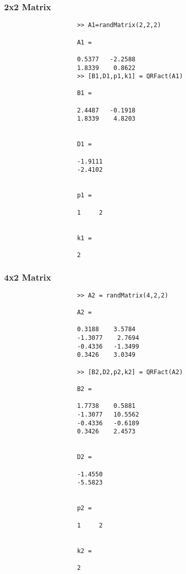 \documentclass[11pt,titlepage]{article}
\begin{document}
			\subsubsection{2x2 Matrix}
				\begin{lstlisting}
					>> A1=randMatrix(2,2,2)
					
					A1 =
					
					0.5377   -2.2588
					1.8339    0.8622
					>> [B1,D1,p1,k1] = QRFact(A1)
					
					B1 =
					
					2.4487   -0.1918
					1.8339    4.8203
					
					
					D1 =
					
					-1.9111
					-2.4102
					
					
					p1 =
					
					1     2
					
					
					k1 =
					
					2
				\end{lstlisting}
			\subsubsection{4x2 Matrix}
				\begin{lstlisting}
					>> A2 = randMatrix(4,2,2)
					
					A2 =
					
					0.3188    3.5784
					-1.3077    2.7694
					-0.4336   -1.3499
					0.3426    3.0349
					
					>> [B2,D2,p2,k2] = QRFact(A2)
					
					B2 =
					
					1.7738    0.5881
					-1.3077   10.5562
					-0.4336   -0.6189
					0.3426    2.4573
					
					
					D2 =
					
					-1.4550
					-5.5823
					
					
					p2 =
					
					1     2
					
					
					k2 =
					
					2
				\end{lstlisting}
\end{document}
